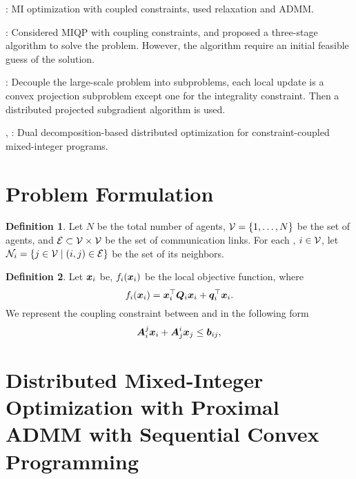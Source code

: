 \documentclass[twocolumn,amsthm]{autart}%
\theoremstyle{definition}
\newtheorem{definition}{Definition}
\theoremstyle{plain}
\begin{document}
\cite{liu2022distributed}: MI optimization with coupled constraints, used relaxation and ADMM.

\cite{liu2021distributed}: Considered MIQP with coupling constraints, and proposed a three-stage algorithm to solve the problem. However, the algorithm require an initial feasible guess of the solution.

\cite{sun2018distributed}: Decouple the large-scale problem into subproblems, each local update is a convex projection subproblem except one for the integrality constraint. Then a distributed projected subgradient algorithm is used.

\cite{yfantis2023hierarchical}, \cite{klostermeier2024numerical}: Dual decomposition-based distributed optimization for constraint-coupled mixed-integer programs.


\section{Problem Formulation}
\begin{definition}
Let $N$ be the total number of agents, $\mathcal{V} = \{1, \dots, N\}$ be the set of agents, and $\mathcal{E} \subset \mathcal{V} \times \mathcal{V}$ be the set of communication links.
For each , $i \in \mathcal{V}$, let $\mathcal{N}_i = \{j \in \mathcal{V} \;|\; (i,j) \in \mathcal{E}\}$ be the set of its neighbors.
\end{definition}

\begin{definition}
Let $\boldsymbol{x}_i$ be, $f_i (\boldsymbol{x}_i)$ be the local objective function,
where
\[
f_i (\boldsymbol{x}_i) = \boldsymbol{x}_i^\top \boldsymbol{Q}_i \boldsymbol{x}_i + \boldsymbol{q}_i^\top \boldsymbol{x}_i.
\]
We represent the coupling constraint between  and  in the following form
\[
\boldsymbol{A}^{j}_{i} \boldsymbol{x}_i + \boldsymbol{A}^{i}_{j} \boldsymbol{x}_j \le \boldsymbol{b}_{ij},
\]
\end{definition}

\section{Distributed Mixed-Integer Optimization with Proximal ADMM with Sequential Convex Programming}
\end{document}
